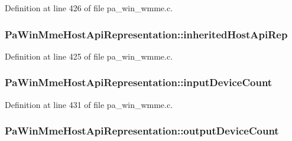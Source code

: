 Definition at line 426 of file pa\+\_\+win\+\_\+wmme.\+c.

\subsubsection[{\texorpdfstring{inherited\+Host\+Api\+Rep}{inheritedHostApiRep}}]{ Pa\+Win\+Mme\+Host\+Api\+Representation\+::inherited\+Host\+Api\+Rep}\hypertarget{struct_pa_win_mme_host_api_representation_aebc8a430de493c658fd81a8cdcb36927}{}\label{struct_pa_win_mme_host_api_representation_aebc8a430de493c658fd81a8cdcb36927}


Definition at line 425 of file pa\+\_\+win\+\_\+wmme.\+c.

\subsubsection[{\texorpdfstring{input\+Device\+Count}{inputDeviceCount}}]{ Pa\+Win\+Mme\+Host\+Api\+Representation\+::input\+Device\+Count}\hypertarget{struct_pa_win_mme_host_api_representation_afeb61346a9e0d1a390f8fd9b9da73480}{}\label{struct_pa_win_mme_host_api_representation_afeb61346a9e0d1a390f8fd9b9da73480}


Definition at line 431 of file pa\+\_\+win\+\_\+wmme.\+c.

\subsubsection[{\texorpdfstring{output\+Device\+Count}{outputDeviceCount}}]{ Pa\+Win\+Mme\+Host\+Api\+Representation\+::output\+Device\+Count}\hypertarget{struct_pa_win_mme_host_api_representation_a59f729b5317014cc61a9957537010129}{}\label{struct_pa_win_mme_host_api_representation_a59f729b5317014cc61a9957537010129}


